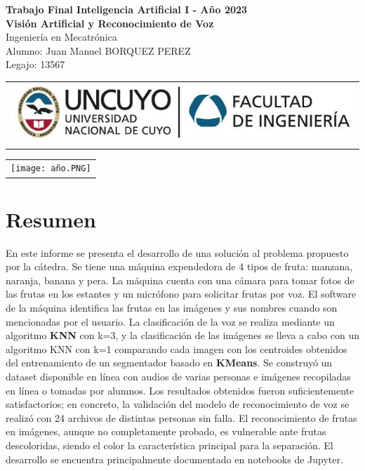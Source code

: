 \documentclass[a4paper, 12pt]{article}
\begin{document}
\begin{titlepage}
    \centering
    \vspace*{5cm}
    {\Large\bfseries Trabajo Final Inteligencia Artificial I - Año 2023}\\
    \vspace{0.2cm}
    {\Large \textbf{Visión Artificial y Reconocimiento de Voz}}\\
    \vspace{0.7cm}
    {\Large Ingeniería en Mecatrónica}\\
    \vspace{1.5cm}
    Alumno: Juan Manuel BORQUEZ PEREZ\\
    Legajo: 13567\\
    \vfill
    {\begin{tabular}{@{}c@{}}\includegraphics[scale=0.4]{escudo.PNG}\end{tabular}}\hspace{10pt}
    {\begin{tabular}{@{}c@{}}\texttt{[image: año.PNG]}\end{tabular}}
\end{titlepage}

\tableofcontents
\newpage
\section{Resumen}
En este informe se presenta el desarrollo de una solución al problema propuesto por la cátedra. Se tiene una máquina expendedora de 4 tipos de fruta: manzana, naranja, banana y pera. La máquina cuenta con una cámara para tomar fotos de las frutas en los estantes y un micrófono para solicitar frutas por voz. El software de la máquina identifica las frutas en las imágenes y sus nombres cuando son mencionadas por el usuario. La clasificación de la voz se realiza mediante un algoritmo \textbf{KNN} con k=3, y la clasificación de las imágenes se lleva a cabo con un algoritmo KNN con k=1 comparando cada imagen con los centroides obtenidos del entrenamiento de un segmentador basado en \textbf{KMeans}. Se construyó un dataset disponible en línea con audios de varias personas e imágenes recopiladas en línea o tomadas por alumnos. Los resultados obtenidos fueron suficientemente satisfactorios; en concreto, la validación del modelo de reconocimiento de voz se realizó con 24 archivos de distintas personas sin falla. El reconocimiento de frutas en imágenes, aunque no completamente probado, es vulnerable ante frutas descoloridas, siendo el color la característica principal para la separación. El desarrollo se encuentra principalmente documentado en notebooks de Jupyter.
\vspace{0.5cm}
\end{document}

